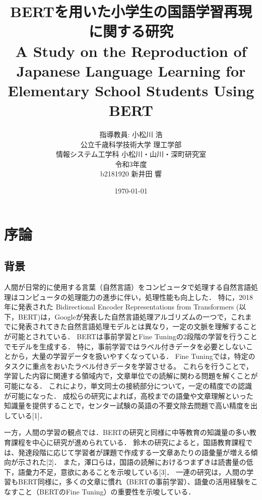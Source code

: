 \documentclass[12pt, a4paper]{ujreport} %
\begin{document}
\title{BERTを用いた小学生の国語学習再現に関する研究\\
A Study on the Reproduction of Japanese Language Learning for Elementary School Students Using BERT}
\author{指導教員: 小松川 浩\\
公立千歳科学技術大学 理工学部\\
情報システム工学科 小松川・山川・深町研究室\\
令和3年度\\
b2181920 新井田 響}
\date{\today}
\maketitle



\chapter{序論\label{cI}}

\section{背景}
人間が日常的に使用する言葉（自然言語）をコンピュータで処理する自然言語処理はコンピュータの処理能力の進歩に伴い，処理性能も向上した．
特に，2018年に発表された Bidirectional Encoder Representations from Transformers (以下，BERT)は，Googleが発表した自然言語処理アルゴリズムの一つで，これまでに発表されてきた自然言語処理モデルとは異なり，一定の文脈を理解することが可能とされている．
BERTは事前学習とFine Tuningの2段階の学習を行うことでモデルを生成する．
特に，事前学習ではラベル付きデータを必要としないことから，大量の学習データを扱いやすくなっている．
Fine Tuningでは，特定のタスクに重点をおいたラベル付きデータを学習させる。
これらを行うことで，学習した内容に関連する領域内で，文章単位での読解に関わる問題を解くことが可能になる．
これにより，単文同士の接続部分について，一定の精度での認識が可能になった．
成松らの研究によれば，高校までの語彙や文章理解といった知識量を提供することで，センター試験の英語の不要文除去問題で高い精度を出している[1]．\par
一方，人間の学習の観点では．BERTの研究と同様に中等教育の知識量の多い教育課程を中心に研究が進められている．
鈴木の研究によると，国語教育課程では、発達段階に応じて学習者が課題で作成する一文章あたりの語彙量が増える傾向が示された[2]．
また，澤口らは，国語の読解におけるつまずきは読書量の低下，語彙力不足，意欲にあることを示唆している[3]．
一連の研究は，人間の学習もBERT同様に，多くの文章に慣れ（BERTの事前学習）、語彙の活用経験をこなすこと（BERTのFine Tuning）の重要性を示唆している．
\end{document}

